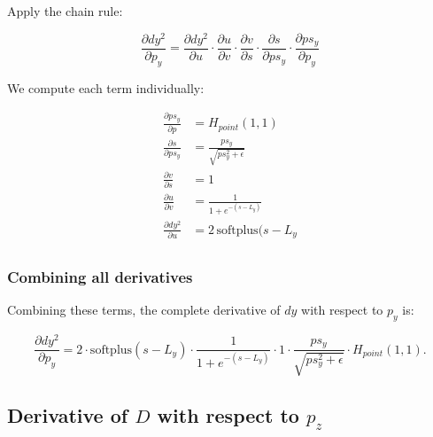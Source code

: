 \documentclass[11pt]{article}
\begin{document}
            Apply the chain rule:
            
            \begin{equation}
                \frac{\partial dy^2}{\partial p_y}
                = \frac{\partial dy^2}{\partial u}
                \cdot \frac{\partial u}{\partial v}
                \cdot \frac{\partial v}{\partial s}
                \cdot \frac{\partial s}{\partial ps_{y}}
                \cdot \frac{\partial ps_{y}}{\partial p_y}
            \end{equation}
            
            We compute each term individually:
            
            \begin{align}
                \frac{\partial ps_{y}}{\partial p} &= H_{point}(1,1) \\
                \frac{\partial s}{\partial ps_{y}} &= \frac{ps_{y}}{\sqrt{ps_{y}^2 + \epsilon}}\\
                \frac{\partial v}{\partial s} &= 1\\
                \frac{\partial u}{\partial v} &= \frac{1}{1 + e^{-(s - L_y)}}\\
                \frac{\partial dy^2}{\partial u} &= 2\,\text{softplus}(s - L_{y}\\
            \end{align}
            
            
            \subsubsection*{Combining all derivatives}
            
            Combining these terms, the complete derivative of \(dy\) with respect to \(p_y\) is:
            
            \begin{equation}
                \frac{\partial dy^2}{\partial p_y} = 2 \cdot
                \text{softplus}(s - L_y)
                \cdot \frac{1}{1 + e^{-(s - L_y)}}
                \cdot 1
                \cdot \frac{ps_{y}}{\sqrt{ps_{y}^2 + \epsilon}}
                \cdot H_{point}(1,1).
            \end{equation}

        \subsection*{Derivative of $D$ with respect to $p_z$}
\end{document}
